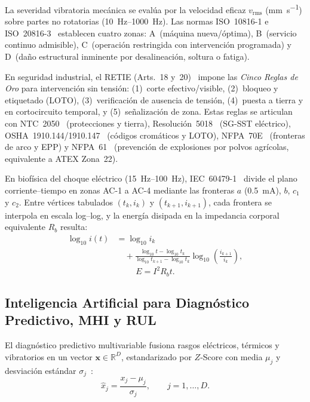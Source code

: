 La severidad vibratoria mecánica se evalúa por la velocidad eficaz $v_{\text{rms}}$ (\unit{\milli\meter\per\second}) sobre partes no rotatorias (\qtyrange[range-phrase={ a }]{10}{1000}{\hertz}). Las normas ISO~10816-1 e ISO~20816-3~\cite{ISO10816,ISO20816} establecen cuatro zonas: A~(máquina nueva/óptima), B~(servicio continuo admisible), C~(operación restringida con intervención programada) y D~(daño estructural inminente por desalineación, soltura o fatiga).

En seguridad industrial, el RETIE (Arts.~18 y~20)~\cite{RETIE2026} impone las \emph{Cinco Reglas de Oro} para intervención sin tensión: (1)~corte efectivo/visible, (2)~bloqueo y etiquetado (LOTO), (3)~verificación de ausencia de tensión, (4)~puesta a tierra y en cortocircuito temporal, y (5)~señalización de zona. Estas reglas se articulan con NTC~2050~\cite{NTC2050} (protecciones y tierra), Resolución~5018~\cite{Res5018} (SG-SST eléctrico), OSHA~1910.144/1910.147~\cite{OSHA1910} (códigos cromáticos y LOTO), NFPA~70E~\cite{NFPA70E} (fronteras de arco y EPP) y NFPA~61~\cite{NFPA61} (prevención de explosiones por polvos agrícolas, equivalente a ATEX Zona~22).

En biofísica del choque eléctrico (\qtyrange[range-phrase={ a }]{15}{100}{\hertz}), IEC~60479-1~\cite{IEC60479} divide el plano corriente--tiempo en zonas AC-1 a AC-4 mediante las fronteras $a$ (\qty{0.5}{\milli\ampere}), $b$, $c_1$ y $c_2$. Entre vértices tabulados $(t_k, i_k)$ y $(t_{k+1}, i_{k+1})$, cada frontera se interpola en escala log--log, y la energía disipada en la impedancia corporal equivalente $R_b$ resulta:
\begin{equation}
\begin{split}
\log_{10} i(t) &= \log_{10} i_k \\
&\quad + \frac{\log_{10} t - \log_{10} t_k}{\log_{10} t_{k+1} - \log_{10} t_k}\log_{10}\!\left(\frac{i_{k+1}}{i_k}\right),
\end{split}
\label{eq:iec60479_interp}
\end{equation}
\begin{equation}
E = I^2 R_b t.
\label{eq:energia_choque}
\end{equation}

\subsection{Inteligencia Artificial para Diagnóstico Predictivo, MHI y RUL}\label{subsec:ia_mhi_rul}

El diagnóstico predictivo multivariable fusiona rasgos eléctricos, térmicos y vibratorios en un vector $\mathbf{x} \in \mathbb{R}^D$, estandarizado por $Z$-Score con media $\mu_j$ y desviación estándar $\sigma_j$~\cite{Soualhi2022}:
\begin{equation}
\hat{x}_j = \frac{x_j - \mu_j}{\sigma_j}, \qquad j = 1, \dots, D.
\label{eq:zscore}
\end{equation}

